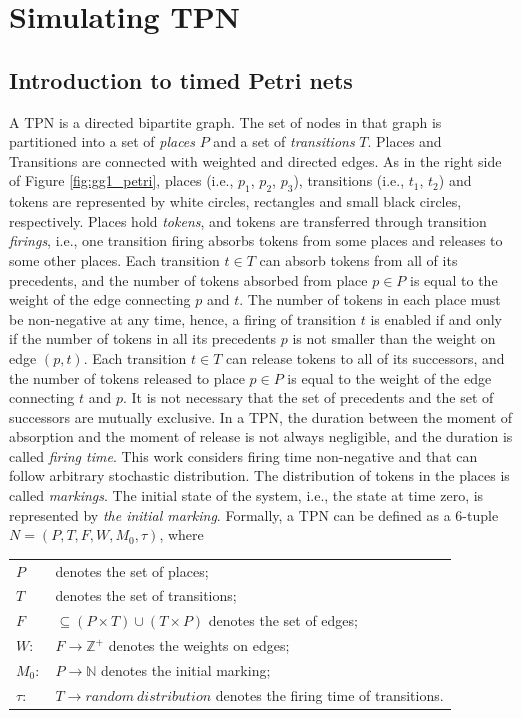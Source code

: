 \documentclass[suppldata]{interact}
\theoremstyle{plain}
\theoremstyle{definition}
\theoremstyle{remark}
\begin{document}



\section{Simulating TPN} \label{sec:sim}

\subsection{Introduction to timed Petri nets}
A TPN is a directed bipartite graph. The set of nodes in that graph is partitioned into a set of \textit{places} $P$ and a set of \textit{transitions} $T$. Places and Transitions are connected with weighted and directed edges. As in the right side of Figure \ref{fig:gg1_petri}, places (i.e., $p_1$, $p_2$, $p_3$), transitions (i.e., $t_1$, $t_2$) and tokens are represented by white circles, rectangles and small black circles, respectively. Places hold \textit{tokens}, and tokens are transferred through transition \textit{firings}, i.e., one transition firing absorbs tokens from some places and releases to some other places. Each transition $t\in{T}$ can absorb tokens from all of its precedents, and the number of tokens absorbed from place $p\in P$ is equal to the weight of the edge connecting $p$ and $t$. The number of tokens in each place must be non-negative at any time, hence, a firing of transition $t$ is enabled if and only if the number of tokens in all its precedents $p$ is not smaller than the weight on edge $(p,t)$. Each transition $t\in{T}$ can release tokens to all of its successors, and the number of tokens released to place $p\in P$ is equal to the weight of the edge connecting $t$ and $p$.  It is not necessary that the set of precedents and the set of successors are mutually exclusive. In a TPN, the duration between the moment of absorption and the moment of release is not always negligible, and the duration is called \textit{firing time}. This work considers firing time non-negative and that can follow arbitrary stochastic distribution. The distribution of tokens in the places is called \textit{markings}. The initial state of the system, i.e., the state at time zero, is represented by \textit{the initial marking}. Formally, a TPN can be defined as a 6-tuple $N=(P, T, F,W, M_0, \tau)$, where
\begin{tabular}{ll}
	${P}$ & denotes the set of places;\\
	${T}$ & denotes the set of transitions;\\
	${F}$ & $\subseteq(P\times T)\cup(T\times P)$ denotes the set of edges;\\
	$W:$ & $F \rightarrow \mathbb{Z}^{+}$ denotes the weights on edges;\\
	$M_0:$ & $P\rightarrow \mathbb{N}$ denotes the initial marking;\\
	$\tau:$ & $T\rightarrow random\ distribution$ denotes the firing time of transitions.\\
\end{tabular}
\end{document}
